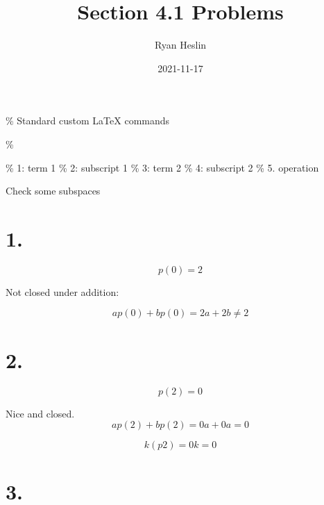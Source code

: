 \documentclass[]{article}
\title{Section 4.1 Problems}
\author{Ryan Heslin}
\date{2021-11-17}
\begin{document}
\maketitle

\% Standard custom LaTeX commands
\newcommand{\abcd}{\begin{bmatrix}a&b\\
c&d\end{bmatrix}}

\newcommand{\m}[1]{\begin{bmatrix}#1\end{bmatrix}}

\newcommand{\vect}[1]{\begin{pmatrix}#1\end{pmatrix}}

\newcommand{\meq}[1]{\begin{split}#1\end{split}}

\newcommand{\bym}[1]{#1\times{m}}

\newcommand{\nby}[1]{n\times{#1}}

\%

\newcommand{\subsp}[2]{\Bigg\{\begin{bmatrix}#1\end{bmatrix}:#2\Bigg\}}

\% 1: term 1 \% 2: subscript 1 \% 3: term 2 \% 4: subscript 2 \% 5.
operation

\newcommand{\dotsn}[5]{#1_2#3_1#5#1_2#3_2#5#1_{#2}#3_{#4}}

Check some subspaces

\hypertarget{section}{%
\section{1.}\label{section}}

\[p(0)=2\]

Not closed under addition:

\[
ap(0)+bp(0)=2a+2b \neq 2
\]

\hypertarget{section-1}{%
\section{2.}\label{section-1}}

\[p(2)=0\]

Nice and closed. \[ap(2) +bp(2) = 0a + 0a = 0\]

\[k(p2)=0k=0\]

\hypertarget{section-2}{%
\section{3.}\label{section-2}}
\end{document}
